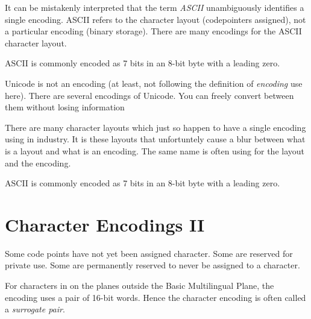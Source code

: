 

It can be mistakenly interpreted that the term \textit{ASCII} 
unambiguously identifies a single encoding. ASCII refers to the 
character layout (codepointers assigned), not a particular encoding (binary storage).
There are many encodings for the ASCII character layout. 

\begin{example}
ASCII is commonly encoded as 7 bits in an 8-bit byte with a leading zero. 
\end{example}

\begin{example}
Unicode is not an encoding (at least, not following the definition of \textit{encoding} use here).
There are several encodings of Unicode. 
You can freely convert between them without losing information
\end{example}



There are many character layouts which just so happen to have a single 
encoding using in industry. It is these layouts that unfortuntely 
cause a blur between what is a layout and what is an encoding. 
The same name is often using for the layout and the encoding. 

\begin{example}
ASCII is commonly encoded as 7 bits in an 8-bit byte with a leading zero. 
\end{example}

\frmrule 





\section{Character Encodings II}




Some code points have not yet been assigned character. 
Some are reserved for private use.
Some are permanently reserved to never be assigned to a character. 





For characters in on the planes outside the Basic Multilingual 
Plane, the encoding uses a pair of 16-bit words. Hence the character 
encoding is often called a \textit{surrogate pair}. 

